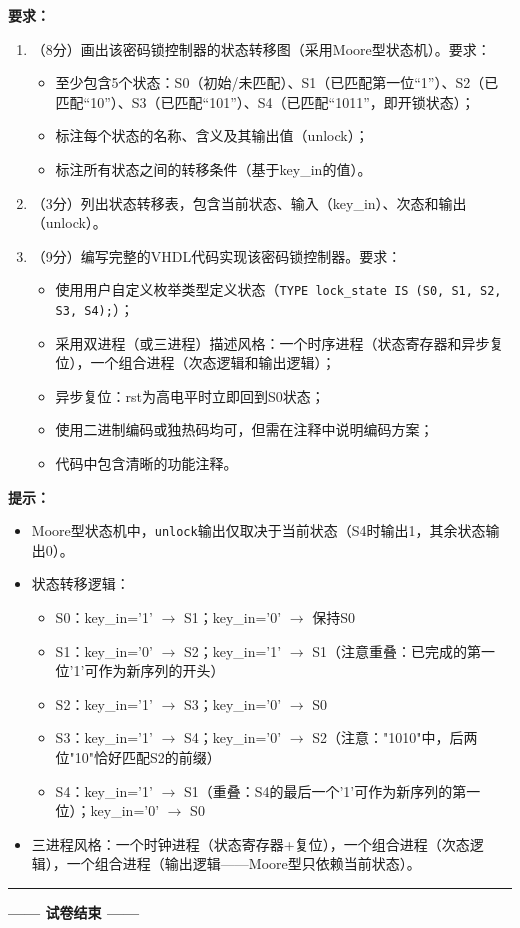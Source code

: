 \vspace{0.3cm}

\textbf{要求：}
\begin{enumerate}[label=(\arabic*)]
  \item （8分）画出该密码锁控制器的状态转移图（采用Moore型状态机）。要求：
  \begin{itemize}
    \item 至少包含5个状态：S0（初始/未匹配）、S1（已匹配第一位“1”）、S2（已匹配“10”）、S3（已匹配“101”）、S4（已匹配“1011”，即开锁状态）；
    \item 标注每个状态的名称、含义及其输出值（unlock）；
    \item 标注所有状态之间的转移条件（基于key\_in的值）。
  \end{itemize}
  \item （3分）列出状态转移表，包含当前状态、输入（key\_in）、次态和输出（unlock）。
  \item （9分）编写完整的VHDL代码实现该密码锁控制器。要求：
  \begin{itemize}
    \item 使用用户自定义枚举类型定义状态（\texttt{TYPE lock\_state IS (S0, S1, S2, S3, S4);}）；
    \item 采用双进程（或三进程）描述风格：一个时序进程（状态寄存器和异步复位），一个组合进程（次态逻辑和输出逻辑）；
    \item 异步复位：rst为高电平时立即回到S0状态；
    \item 使用二进制编码或独热码均可，但需在注释中说明编码方案；
    \item 代码中包含清晰的功能注释。
  \end{itemize}
\end{enumerate}

\begin{framed}
\textbf{提示：}
\begin{itemize}
  \item Moore型状态机中，\texttt{unlock}输出仅取决于当前状态（S4时输出1，其余状态输出0）。
  \item 状态转移逻辑：
  \begin{itemize}
    \item S0：key\_in='1' $\to$ S1；key\_in='0' $\to$ 保持S0
    \item S1：key\_in='0' $\to$ S2；key\_in='1' $\to$ S1（注意重叠：已完成的第一位'1'可作为新序列的开头）
    \item S2：key\_in='1' $\to$ S3；key\_in='0' $\to$ S0
    \item S3：key\_in='1' $\to$ S4；key\_in='0' $\to$ S2（注意："1010"中，后两位"10"恰好匹配S2的前缀）
    \item S4：key\_in='1' $\to$ S1（重叠：S4的最后一个'1'可作为新序列的第一位）；key\_in='0' $\to$ S0
  \end{itemize}
  \item 三进程风格：一个时钟进程（状态寄存器+复位），一个组合进程（次态逻辑），一个组合进程（输出逻辑——Moore型只依赖当前状态）。
\end{itemize}
\end{framed}

\vspace{0.3cm}

{\centering
\rule{0.8\textwidth}{0.5pt}
\vspace{0.3cm}

\textbf{—— 试卷结束 ——}

\vspace{0.5cm}}

\endinput
